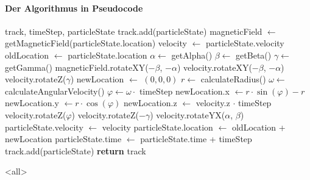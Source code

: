 \paragraph{Der Algorithmus in Pseudocode}
\label{sec:algorithmus}
\begin{algorithmic}[1]
  \STATE {}
  \STATE track, timeStep, particleState
  \STATE track.add(particleState)
  \STATE {}
  \STATE magneticField $\leftarrow$ getMagneticField(particleState.location)
  \STATE velocity $\leftarrow$ particleState.velocity
  \STATE oldLocation $\leftarrow$ particleState.location
  \STATE
  \STATE {}
  \STATE $\alpha \leftarrow$ getAlpha()
  \STATE $\beta \leftarrow$ getBeta()
  \STATE $\gamma \leftarrow$ getGamma()
  \STATE
  \STATE {}
  \STATE magneticField.rotateXY($-\beta$, $-\alpha$)
  \STATE velocity.rotateXY($-\beta$, $-\alpha$)
  \STATE velocity.rotateZ($\gamma$)
  \STATE newLocation $\leftarrow$ \(\left(0, 0, 0\right)\)
  \STATE
  \STATE {}
  \STATE $r \leftarrow$ calculateRadius()
  \STATE $\omega \leftarrow$ calculateAngularVelocity()
  \STATE $\varphi \leftarrow \omega \cdot$ timeStep
  \STATE
  \STATE {}
  \STATE newLocation.x $\leftarrow r \cdot \sin(\varphi) -r$
  \STATE newLocation.y $\leftarrow r \cdot \cos(\varphi)$
  \STATE newLocation.z $\leftarrow$ velocity.z $\cdot$ timeStep
  \STATE
  \STATE {}
  \STATE velocity.rotateZ($\varphi$)
  \STATE
  \STATE {}
  \STATE velocity.rotateZ($-\gamma$)
  \STATE velocity.rotateYX($\alpha$, $\beta$)
  \STATE particleState.velocity $\leftarrow$ velocity
  \STATE particleState.location $\leftarrow$ oldLocation + newLocation
  \STATE
  \STATE {}
  \STATE particleState.time $\leftarrow$ particleState.time + timeStep
  \STATE
  \STATE {}
  \STATE track.add(particleState)
  \ENDWHILE
  \STATE
  \STATE \textbf{return} track
\end{algorithmic}

\mode<all>
